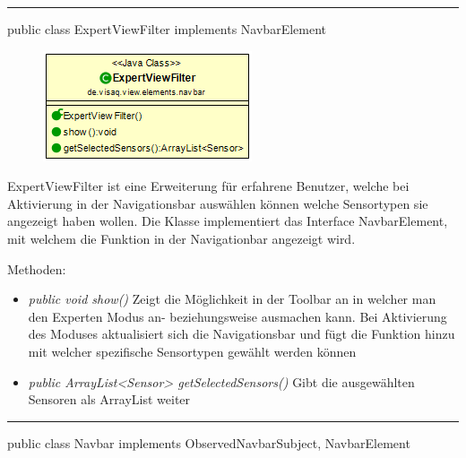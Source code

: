 

\rule{\textwidth}{0.4pt}
public class ExpertViewFilter implements NavbarElement

\begin{minipage}{0.3\textwidth}
    \begin{figure}[H]
        \includegraphics[scale = 0.6]{media/frontend/view/de.view.elements.navbar/ExpertviewFilterClass.png}
    \end{figure}
    \end{minipage} \hfill
    \begin{minipage}{0.6\textwidth}
ExpertViewFilter ist eine Erweiterung für erfahrene Benutzer, welche bei Aktivierung in der Navigationsbar auswählen können welche Sensortypen sie angezeigt haben wollen. Die Klasse implementiert das Interface NavbarElement, mit welchem die Funktion in der Navigationbar angezeigt wird.
\end{minipage}

Methoden:
\begin{itemize}
    \item \emph{public void show()} Zeigt die Möglichkeit in der Toolbar an in welcher man den Experten Modus an- beziehungsweise ausmachen kann. Bei Aktivierung des Moduses aktualisiert sich die Navigationsbar und fügt die Funktion hinzu mit welcher spezifische Sensortypen gewählt werden können
    \item \emph{public ArrayList<Sensor> getSelectedSensors()} Gibt die ausgewählten Sensoren als ArrayList weiter
\end{itemize}
\clearpage %
\rule{\textwidth}{0.4pt}
public class Navbar implements ObservedNavbarSubject, NavbarElement

